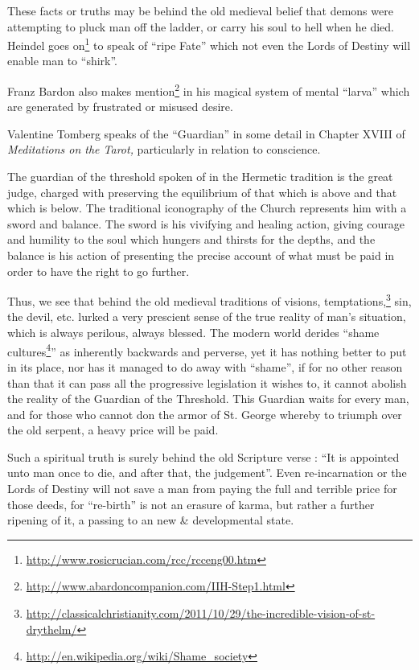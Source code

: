 These facts or truths may be behind the old medieval belief that demons were attempting to pluck man off the ladder, or carry his soul to hell when he died. Heindel goes on\footnote{\url{http://www.rosicrucian.com/rcc/rcceng00.htm}} to speak of ``ripe Fate'' which not even the Lords of Destiny will enable man to ``shirk''.

Franz Bardon also makes mention\footnote{\url{http://www.abardoncompanion.com/IIH-Step1.html}} in his magical system of mental ``larva'' which are generated by frustrated or misused desire.

Valentine Tomberg speaks of the ``Guardian'' in some detail in Chapter XVIII of \emph{Meditations on the Tarot,} particularly in relation to conscience.

\begin{quotex}
The guardian of the threshold spoken of in the Hermetic tradition is the great judge, charged with preserving the equilibrium of that which is above and that which is below. The traditional iconography of the Church represents him with a sword and balance. The sword is his vivifying and healing action, giving courage and humility to the soul which hungers and thirsts for the depths, and the balance is his action of presenting the precise account of what must be paid in order to have the right to go further.
\end{quotex}


Thus, we see that behind the old medieval traditions of visions, temptations,\footnote{\url{http://classicalchristianity.com/2011/10/29/the-incredible-vision-of-st-drythelm/}} sin, the devil, etc. lurked a very prescient sense of the true reality of man's situation, which is always perilous, always blessed. The modern world derides ``shame cultures\footnote{\url{http://en.wikipedia.org/wiki/Shame\_society}}'' as inherently backwards and perverse, yet it has nothing better to put in its place, nor has it managed to do away with ``shame'', if for no other reason than that it can pass all the progressive legislation it wishes to, it cannot abolish the reality of the Guardian of the Threshold. This Guardian waits for every man, and for those who cannot don the armor of St. George whereby to triumph over the old serpent, a heavy price will be paid.

Such a spiritual truth is surely behind the old Scripture verse : ``It is appointed unto man once to die, and after that, the judgement''. Even re-incarnation or the Lords of Destiny will not save a man from paying the full and terrible price for those deeds, for ``re-birth'' is not an erasure of karma, but rather a further ripening of it, a passing to an new \& developmental state.

